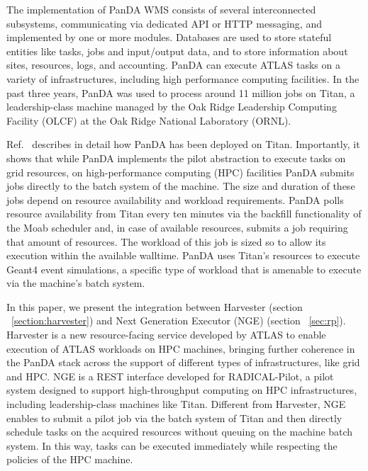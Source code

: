 \documentclass{webofc}
\begin{document}
The implementation of PanDA WMS consists of several interconnected
subsystems, communicating via dedicated API or HTTP messaging, and
implemented by one or more modules. Databases are used to store stateful
entities like tasks, jobs and input/output data, and to store information
about sites, resources, logs, and accounting. PanDA can execute ATLAS tasks
on a variety of infrastructures, including high performance computing
facilities. In the past three years, PanDA was used to process around 11 million
jobs on Titan, a leadership-class machine managed by the Oak Ridge Leadership
Computing Facility (OLCF) at the Oak Ridge National Laboratory (ORNL).

Ref.~\cite{Doleynik2017high} describes in detail how PanDA has been deployed
on Titan. Importantly, it shows that while PanDA implements the pilot
abstraction to execute tasks on grid resources, on high-performance computing (HPC) facilities PanDA
submits jobs directly to the batch system of the machine. The size and
duration of these jobs depend on resource availability and workload
requirements. PanDA polls resource availability from Titan every ten minutes
via the backfill functionality of the Moab scheduler and, in case of available resources, 
submits a job requiring that amount of resources. The workload of this job is sized so
to allow its execution within the available walltime. PanDA uses Titan’s
resources to execute Geant4 event simulations, a specific type of workload
that is amenable to execute via the machine’s batch system.

In this paper, we present the integration between Harvester (section ~\ref{section:harvester}) and Next
Generation Executor (NGE) (section ~\ref{sec:rp}). Harvester is a new resource-facing service
developed by ATLAS to enable execution of ATLAS workloads on HPC machines,
bringing further coherence in the PanDA stack across the support of different
types of infrastructures, like grid and HPC. NGE is a REST interface
developed for RADICAL-Pilot, a pilot system designed to support
high-throughput computing on HPC infrastructures, including leadership-class
machines like Titan. Different from Harvester, NGE enables to submit a pilot
job via the batch system of Titan and then directly schedule tasks on the
acquired resources without queuing on the machine batch system. In this way,
tasks can be executed immediately while respecting the policies of the HPC
machine.
\end{document}
